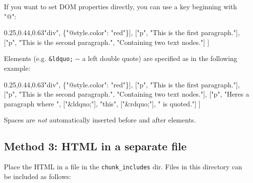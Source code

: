 \documentclass[
]{article}
\newenvironment{Shaded}{}{}
\newcommand{\NormalTok}[1]{#1}
\newcommand{\OperatorTok}[1]{\textcolor[rgb]{0.40,0.40,0.40}{#1}}
\newcommand{\StringTok}[1]{\textcolor[rgb]{0.25,0.44,0.63}{#1}}
\begin{document}
If you want to set DOM properties directly, you can use a key beginning
with "@":

\begin{Shaded}
\begin{Highlighting}[]
\NormalTok{    [[}\StringTok{"div"}\OperatorTok{,}\NormalTok{ \{}\StringTok{"@style.color"}\OperatorTok{:} \StringTok{"red"}\NormalTok{\}]}\OperatorTok{,}
\NormalTok{        [}\StringTok{"p"}\OperatorTok{,} \StringTok{"This is the first paragraph."}\NormalTok{]}\OperatorTok{,}
\NormalTok{        [}\StringTok{"p"}\OperatorTok{,} \StringTok{"This is the second paragraph."}\OperatorTok{,} \StringTok{"Containing two text nodes."}\NormalTok{]}
\NormalTok{    ]}
\end{Highlighting}
\end{Shaded}

Elements (e.g. \texttt{\&ldquo;} -\/- a left double quote) are specified
as in the following example:

\begin{Shaded}
\begin{Highlighting}[]
\NormalTok{    [[}\StringTok{"div"}\OperatorTok{,}\NormalTok{ \{}\StringTok{"@style.color"}\OperatorTok{:} \StringTok{"red"}\NormalTok{\}]}\OperatorTok{,}
\NormalTok{        [}\StringTok{"p"}\OperatorTok{,} \StringTok{"This is the first paragraph."}\NormalTok{]}\OperatorTok{,}
\NormalTok{        [}\StringTok{"p"}\OperatorTok{,} \StringTok{"This is the second paragraph."}\OperatorTok{,} \StringTok{"Containing two text nodes."}\NormalTok{]}\OperatorTok{,}
\NormalTok{        [}\StringTok{"p"}\OperatorTok{,} \StringTok{"Here\textquotesingle{}s a paragraph where "}\OperatorTok{,}\NormalTok{ [}\StringTok{"\&ldquo;"}\NormalTok{]}\OperatorTok{,} \StringTok{"this"}\OperatorTok{,}\NormalTok{ [}\StringTok{"\&rdquo;"}\NormalTok{]}\OperatorTok{,} \StringTok{" is quoted."}\NormalTok{]}
\NormalTok{    ]}
\end{Highlighting}
\end{Shaded}

Spaces are \emph{not} automatically inserted before and after elements.

\hypertarget{method-3-html-in-a-separate-file}{%
\subsection{Method 3: HTML in a separate
file}\label{method-3-html-in-a-separate-file}}

Place the HTML in a file in the \texttt{chunk\_includes} dir. Files in
this directory can be included as follows:
\end{document}
